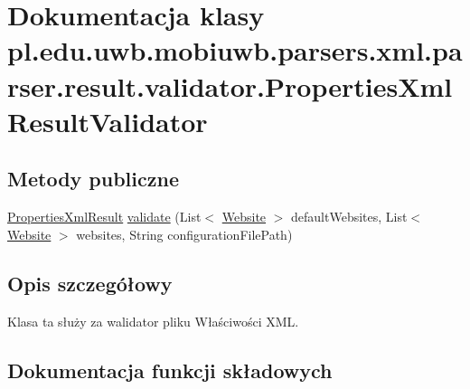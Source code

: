 \hypertarget{classpl_1_1edu_1_1uwb_1_1mobiuwb_1_1parsers_1_1xml_1_1parser_1_1result_1_1validator_1_1_properties_xml_result_validator}{}\section{Dokumentacja klasy pl.\+edu.\+uwb.\+mobiuwb.\+parsers.\+xml.\+parser.\+result.\+validator.\+Properties\+Xml\+Result\+Validator}
\label{classpl_1_1edu_1_1uwb_1_1mobiuwb_1_1parsers_1_1xml_1_1parser_1_1result_1_1validator_1_1_properties_xml_result_validator}
\subsection*{Metody publiczne}
\begin{DoxyCompactItemize}
\item 
\hyperlink{classpl_1_1edu_1_1uwb_1_1mobiuwb_1_1parsers_1_1xml_1_1parser_1_1result_1_1model_1_1_properties_xml_result}{Properties\+Xml\+Result} \hyperlink{classpl_1_1edu_1_1uwb_1_1mobiuwb_1_1parsers_1_1xml_1_1parser_1_1result_1_1validator_1_1_properties_xml_result_validator_a90ecc25f8fe1a544e3ec3aa561cb1e29}{validate} (List$<$ \hyperlink{classpl_1_1edu_1_1uwb_1_1mobiuwb_1_1parsers_1_1xml_1_1model_1_1_website}{Website} $>$ default\+Websites, List$<$ \hyperlink{classpl_1_1edu_1_1uwb_1_1mobiuwb_1_1parsers_1_1xml_1_1model_1_1_website}{Website} $>$ websites, String configuration\+File\+Path)
\end{DoxyCompactItemize}


\subsection{Opis szczegółowy}
Klasa ta służy za walidator pliku Właściwości X\+M\+L. 

\subsection{Dokumentacja funkcji składowych}
\hypertarget{classpl_1_1edu_1_1uwb_1_1mobiuwb_1_1parsers_1_1xml_1_1parser_1_1result_1_1validator_1_1_properties_xml_result_validator_a90ecc25f8fe1a544e3ec3aa561cb1e29}{}
